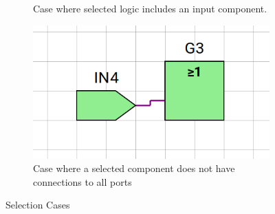 \begin{figure} [h]
\begin{subfigure}{0.48\textwidth}
        \caption{Case where selected logic includes an input component.}
        \label{subfig:SelCase3}
    \end{subfigure}
    \begin{subfigure}{0.48\textwidth}
        \centering
        \includegraphics[width=0.8\linewidth]{04.ImpPlan/SelCase4.png}
        \caption{Case where a selected component does not have connections to all ports}
        \label{subfig:SelCase4}
    \end{subfigure}
    \caption{Selection Cases}
    \label{fig:SelCases}
\end{figure}

